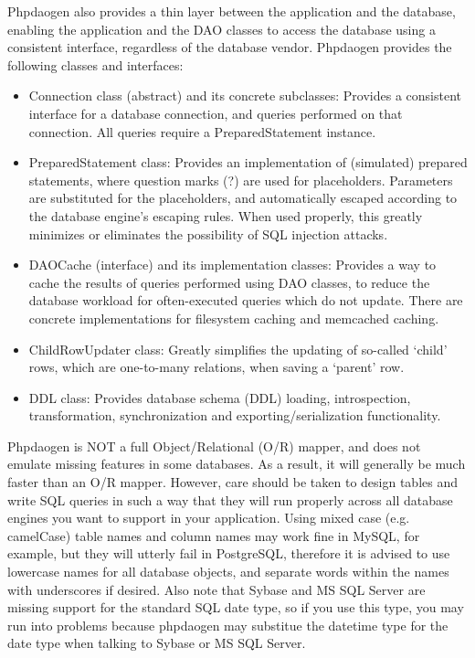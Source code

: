 \documentclass[letterpaper,10pt,english]{sphinxmanual}
\begin{document}
Phpdaogen also provides a thin layer between the application and the database, enabling the
application and the DAO classes to access the database using a consistent interface, regardless of
the database vendor.  Phpdaogen provides the following classes and interfaces:
\begin{itemize}
\item {} 
Connection class (abstract) and its concrete subclasses: Provides a consistent interface for a
database connection, and queries performed on that connection.  All queries require a
PreparedStatement instance.

\item {} 
PreparedStatement class: Provides an implementation of (simulated) prepared statements, where
question marks (?) are used for placeholders. Parameters are substituted for the placeholders, and
automatically escaped according to the database engine's escaping rules.  When used properly, this
greatly minimizes or eliminates the possibility of SQL injection attacks.

\item {} 
DAOCache (interface) and its implementation classes: Provides a way to cache the results of
queries performed using DAO classes, to reduce the database workload for often-executed queries
which do not update.  There are concrete implementations for filesystem caching and memcached
caching.

\item {} 
ChildRowUpdater class: Greatly simplifies the updating of so-called `child' rows, which are
one-to-many relations, when saving a `parent' row.

\item {} 
DDL class: Provides database schema (DDL) loading, introspection, transformation, synchronization
and exporting/serialization functionality.

\end{itemize}

Phpdaogen is NOT a full Object/Relational (O/R) mapper, and does not emulate missing features in
some databases.  As a result, it will generally be much faster than an O/R mapper.  However, care
should be taken to design tables and write SQL queries in such a way that they will run properly
across all database engines you want to support in your application.  Using mixed case
(e.g. camelCase) table names and column names may work fine in MySQL, for example, but they will
utterly fail in PostgreSQL, therefore it is advised to use lowercase names for all database objects,
and separate words within the names with underscores if desired.  Also note that Sybase and MS SQL
Server are missing support for the standard SQL date type, so if you use this type, you may run into
problems because phpdaogen may substitue the datetime type for the date type when talking to Sybase
or MS SQL Server.
\end{document}
